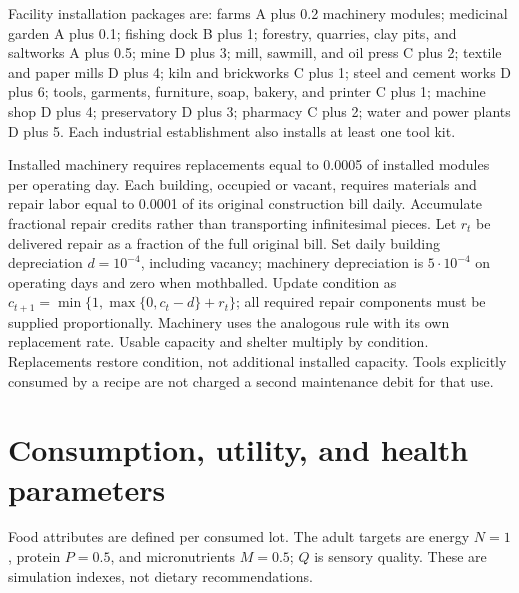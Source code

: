 \documentclass[10pt,a4paper,twocolumn]{article}
\begin{document}
Facility installation packages are: farms A plus 0.2 machinery modules;
medicinal garden A plus 0.1; fishing dock B plus 1;
forestry, quarries, clay pits, and saltworks A plus 0.5;
mine D plus 3; mill, sawmill, and oil press C plus 2;
textile and paper mills D plus 4; kiln and brickworks C plus 1;
steel and cement works D plus 6; tools, garments, furniture, soap,
bakery, and printer C plus 1; machine shop D plus 4;
preservatory D plus 3; pharmacy C plus 2; water and power plants D plus 5.
Each industrial establishment also installs at least one tool kit.

Installed machinery requires replacements equal to 0.0005 of installed
modules per operating day. Each building, occupied or vacant, requires materials
and repair labor equal to 0.0001 of its original construction bill daily.
Accumulate fractional repair credits rather than transporting infinitesimal
pieces. Let $r_t$ be delivered repair as a fraction of the full original
bill. Set daily building depreciation $d=10^{-4}$, including vacancy;
machinery depreciation is $5\cdot10^{-4}$ on operating days and zero
when mothballed. Update condition as
$c_{t+1}=\min\{1,\max\{0,c_t-d\}+r_t\}$; all required repair components
must be supplied proportionally. Machinery uses the analogous rule with
its own replacement rate. Usable capacity and shelter multiply by
condition. Replacements restore condition, not additional installed
capacity. Tools explicitly consumed by a recipe are not charged a second
maintenance debit for that use.

\section{Consumption, utility, and health parameters}\label{app:utility}
Food attributes are defined per consumed lot. The adult targets are
energy $N=1$, protein $P=0.5$, and micronutrients $M=0.5$; $Q$ is sensory
quality. These are simulation indexes, not dietary recommendations.
\end{document}
